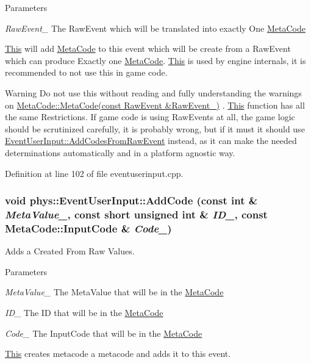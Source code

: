 \begin{DoxyParams}{Parameters}
\item[{\em RawEvent\_\-}]The RawEvent which will be translated into exactly One \hyperlink{classphys_1_1MetaCode}{MetaCode}\end{DoxyParams}
\hyperlink{structThis}{This} will add \hyperlink{classphys_1_1MetaCode}{MetaCode} to this event which will be create from a RawEvent which can produce Exactly one \hyperlink{classphys_1_1MetaCode}{MetaCode}. \hyperlink{structThis}{This} is used by engine internals, it is recommended to not use this in game code. \begin{DoxyWarning}{Warning}
Do not use this without reading and fully understanding the warnings on \hyperlink{classphys_1_1MetaCode_ad9a618b5cc6f9d0cf0a4bc4f47bf98e8}{MetaCode::MetaCode(const RawEvent \&RawEvent\_\-)} . \hyperlink{structThis}{This} function has all the same Restrictions. If game code is using RawEvents at all, the game logic should be scrutinized carefully, it is probably wrong, but if it must it should use \hyperlink{classphys_1_1EventUserInput_a26a39a23deab9e54c140cc0a1cbbe6a9}{EventUserInput::AddCodesFromRawEvent} instead, as it can make the needed determinations automatically and in a platform agnostic way. 
\end{DoxyWarning}


Definition at line 102 of file eventuserinput.cpp.

\hypertarget{classphys_1_1EventUserInput_ac9d4d8372fad7d91a5508d9e612a10e9}{
\subsubsection[{AddCode}]{\setlength{\rightskip}{0pt plus 5cm}void phys::EventUserInput::AddCode (const int \& {\em MetaValue\_\-}, \/  const short unsigned int \& {\em ID\_\-}, \/  const {\bf MetaCode::InputCode} \& {\em Code\_\-})}}
\label{d7/df5/classphys_1_1EventUserInput_ac9d4d8372fad7d91a5508d9e612a10e9}


Adds a Created From Raw Values. 


\begin{DoxyParams}{Parameters}
\item[{\em MetaValue\_\-}]The MetaValue that will be in the \hyperlink{classphys_1_1MetaCode}{MetaCode} \item[{\em ID\_\-}]The ID that will be in the \hyperlink{classphys_1_1MetaCode}{MetaCode} \item[{\em Code\_\-}]The InputCode that will be in the \hyperlink{classphys_1_1MetaCode}{MetaCode}\end{DoxyParams}
\hyperlink{structThis}{This} creates metacode a metacode and adds it to this event. 

